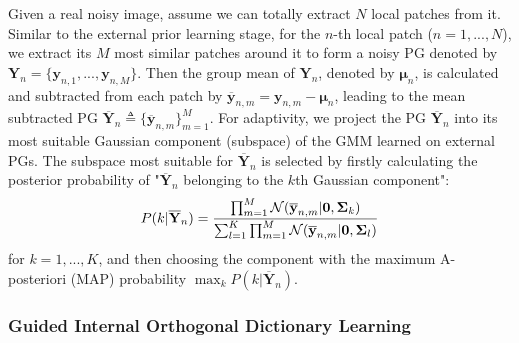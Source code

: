\documentclass[10pt,twocolumn,letterpaper]{article}
\begin{document}
Given a real noisy image, assume we can totally extract $N$ local patches from it. Similar to the external prior learning stage, for the $n$-th local patch ($n=1,...,N$), we extract its $M$ most similar patches around it to form a noisy PG denoted by $\mathbf{Y}_{n} = \{\mathbf{y}_{n,1},...,\mathbf{y}_{n,M}\}$. Then the group mean of $\mathbf{Y}_{n}$, denoted by $\bm{\mu}_{n}$, is calculated and subtracted from each patch by $\mathbf{\overline{y}}_{n,m}=\mathbf{y}_{n,m}-\bm{\mu}_{n}$, leading to the mean subtracted PG $\mathbf{\overline{Y}}_{n}\triangleq \{\mathbf{\overline{y}}_{n,m}\}_{m=1}^{M}$. For adaptivity, we project the PG $\mathbf{\overline{Y}}_{n}$ into its most suitable Gaussian component (subspace) of the GMM learned on external PGs. The subspace most suitable for $\mathbf{\overline{Y}}_{n}$ is selected by firstly calculating the posterior probability of "$\mathbf{\overline{Y}}_{n}$ belonging to the $k$th Gaussian component":
\vspace{-2mm}
\begin{equation}\label{equ4}\vspace{-1mm}
P(k|\mathbf{\overline{Y}}_{n})=\frac{\prod_{m=1}^{M}\mathcal{N}(\mathbf{\overline{y}}_{n,m}|\mathbf{0},\mathbf{\Sigma}_{k})}{\sum_{l=1}^{K}\prod_{m=1}^{M}\mathcal{N}(\mathbf{\overline{y}}_{n,m}|\mathbf{0},\mathbf{\Sigma}_{l})}
\end{equation}
for $k=1,...,K$, and then choosing the component with the maximum A-posteriori (MAP) probability $\max_{k}P(k|\mathbf{\overline{Y}}_{n})$.

\vspace{-2mm}
\subsubsection{Guided Internal Orthogonal Dictionary Learning}
\vspace{-2mm}
\end{document}
